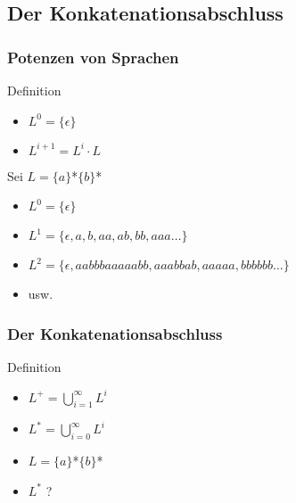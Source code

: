 \documentclass{beamer}
\begin{document}
\subsection[Der Konkatenationsabschluss]{Der Konkatenationsabschluss}
\begin{frame}
\frametitle{Potenzen von Sprachen}
\begin{block}{Definition}
\begin{itemize}
  \item $L^{0} = \{\epsilon\}$
  \item $L^{i+1} = L^{i} \cdot L$
\end{itemize}
\end{block}
\begin{example}
Sei $L = \{a\}$*$\{b\}$*
\begin{itemize}[<+->]
  \item $L^{0} = \{\epsilon\}$
  \item $L^{1} = \{\epsilon,a,b,aa,ab,bb,aaa\ldots\}$
  \item $L^{2} = \{\epsilon,aabbbaaaaabb,aaabbab,aaaaa,bbbbbb\ldots\}$
  \item usw.
\end{itemize}
\end{example}
\end{frame}

\begin{frame}
\frametitle{Der Konkatenationsabschluss}
\begin{block}{Definition}
\begin{itemize}[<+->]
  \item $L^{+} = \bigcup\limits_{i = 1}^{\infty} L^{i}$
  \item $L^{*} = \bigcup\limits_{i = 0}^{\infty} L^{i}$
\end{itemize}
\end{block}

\begin{example}
\begin{itemize}[<+->]
  \item $L = \{a\}$*$\{b\}$*
  \item $L^{*}$ ?   
\end{itemize}
\end{example}
\end{frame}
\end{document}
